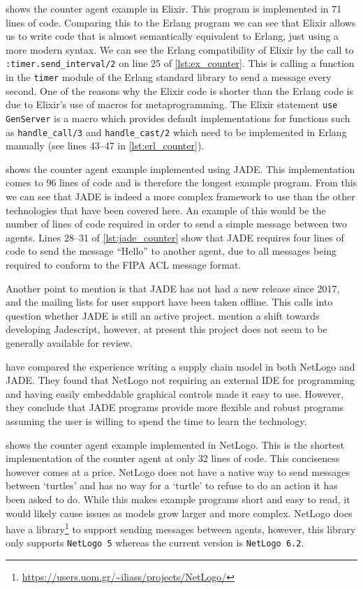  shows the counter agent example in Elixir.
This program is implemented in 71 lines of code.
Comparing this to the Erlang program we can see that Elixir allows us to write code that is almost semantically equivalent to Erlang, just using a more modern syntax.
We can see the Erlang compatibility of Elixir by the call to \verb|:timer.send_interval/2| on line 25 of \cref{lst:ex_counter}.
This is calling a function in the \verb|timer| module of the Erlang standard library to send a message every second.
One of the reasons why the Elixir code is shorter than the Erlang code is due to Elixir's use of macros for metaprogramming.
The Elixir statement \verb|use GenServer| is a macro which provides default implementations for functions such as \verb|handle_call/3| and \verb|handle_cast/2| which need to be implemented in Erlang manually (see lines 43--47 in \cref{lst:erl_counter}).

 shows the counter agent example implemented using JADE\@.
This implementation comes to 96 lines of code and is therefore the longest example program.
From this we can see that JADE is indeed a more complex framework to use than the other technologies that have been covered here.
An example of this would be the number of lines of code required in order to send a simple message between two agents.
Lines 28--31 of \cref{lst:jade_counter} show that JADE requires four lines of code to send the message ``Hello'' to another agent, due to all messages being required to conform to the FIPA ACL message format.

Another point to mention is that JADE has not had a new release since 2017, and the mailing lists for user support have been taken offline.
This calls into question whether JADE is still an active project.
 mention a shift towards developing Jadescript, however, at present this project does not seem to be generally available for review.

 have compared the experience writing a supply chain model in both NetLogo and JADE\@.
They found that NetLogo not requiring an external IDE for programming and having easily embeddable graphical controls made it easy to use.
However, they conclude that JADE programs provide more flexible and robust programs assuming the user is willing to spend the time to learn the technology.

 shows the counter agent example implemented in NetLogo.
This is the shortest implementation of the counter agent at only 32 lines of code.
This conciseness however comes at a price.
NetLogo does not have a native way to send messages between `turtles' and has no way for a `turtle' to refuse to do an action it has been asked to do.
While this makes example programs short and easy to read, it would likely cause issues as models grow larger and more complex.
NetLogo does have a library\footnote{\url{https://users.uom.gr/~iliass/projects/NetLogo/}} to support sending messages between agents, however, this library only supports \verb|NetLogo 5| whereas the current version is \verb|NetLogo 6.2|.~\cite{sakellariou2008enhancing}

